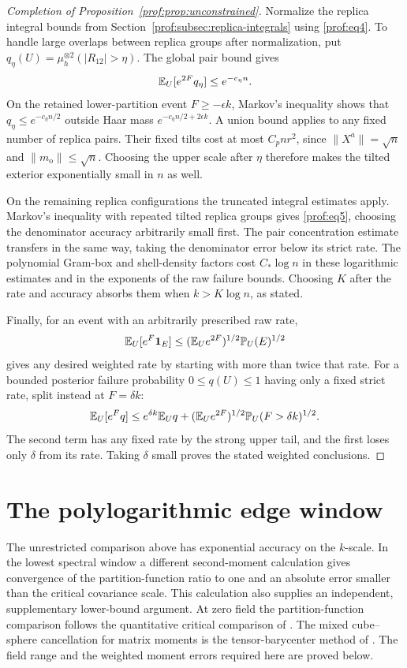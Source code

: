 \begin{proof}[Completion of Proposition~\ref{prof:prop:unconstrained}]
Normalize the replica integral bounds from
Section~\ref{prof:subsec:replica-integrals} using \eqref{prof:eq4}.
To handle large overlaps between replica groups after normalization,
put $q_\eta(U)=\mu_h^{\otimes2}(|R_{12}|>\eta)$. The global pair
bound gives
\[
 \mathbb E_U[e^{2F}q_\eta]\le e^{-c_\eta n}.
\]
On the retained lower-partition event $F\ge-\epsilon k$, Markov's
inequality shows that $q_\eta\le e^{-c_\eta n/2}$ outside Haar mass
$e^{-c_\eta n/2+2\epsilon k}$. A union bound applies to any fixed
number of replica pairs. Their fixed tilts cost at most $C_pnr^2$,
since $\|X^a\|=\sqrt n$ and $\|m_{\mathrm o}\|\le\sqrt n$.
Choosing the upper scale after $\eta$ therefore makes the tilted
exterior exponentially small in $n$ as well.

On the remaining replica configurations the truncated integral
estimates apply. Markov's inequality with repeated tilted replica
groups gives \eqref{prof:eq5}, choosing the denominator accuracy
arbitrarily small first. The pair concentration estimate transfers
in the same way, taking the denominator error below its strict
rate. The polynomial Gram-box and shell-density factors cost
$C_*\log n$ in these logarithmic estimates and in the exponents
of the raw failure bounds. Choosing $K$ after the rate
and accuracy absorbs them when $k>K\log n$, as stated.

Finally, for an event with an arbitrarily prescribed raw rate,
\[
 \mathbb E_U[e^F\mathbf1_E]\le
       (\mathbb E_Ue^{2F})^{1/2}\mathbb P_U(E)^{1/2}
\]
gives any desired weighted rate by starting with more than twice that
rate. For a bounded posterior failure probability $0\le q(U)\le1$
having only a fixed strict rate, split instead at $F=\delta k$:
\[
 \mathbb E_U[e^Fq]\le e^{\delta k}\mathbb E_Uq+
       (\mathbb E_Ue^{2F})^{1/2}\mathbb P_U(F>\delta k)^{1/2}.
\]
The second term has any fixed rate by the strong upper tail, and the
first loses only $\delta$ from its rate. Taking $\delta$ small proves
the stated weighted conclusions.
\end{proof}

\section{The polylogarithmic edge window}
\label{prof:sec:polylog}

The unrestricted comparison above has exponential accuracy on the
$k$-scale.  In the lowest spectral window a different second-moment
calculation gives convergence of the partition-function ratio to
one and an absolute error smaller than the critical covariance
scale.  This calculation also supplies an independent, supplementary
lower-bound argument.  At zero field the partition-function
comparison follows the quantitative critical comparison of
\cite[Theorem~1.6 and Section~3.3]{DuHuang2026CriticalFluctuations}.
The mixed cube--sphere cancellation for matrix moments is the
tensor-barycenter method of
\cite[Section~3.2, Lemma~3.5]{DuHuang2026CriticalOverlap}.
The field range and the weighted moment errors required here are
proved below.

